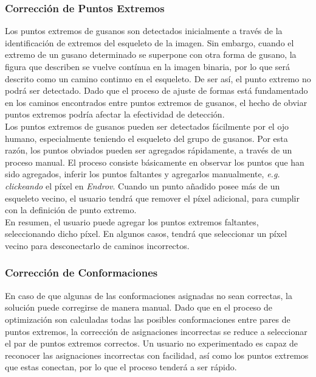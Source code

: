 \subsubsection{Correcci\'on de Puntos Extremos}
\label{sec:endpointop}

Los puntos extremos de gusanos son detectados inicialmente a trav\'es de la
identificaci\'on de extremos del esqueleto de la imagen. Sin embargo, cuando
el extremo de un gusano determinado se superpone con otra forma de gusano, la
figura que describen se vuelve cont\'inua en la imagen binaria, por lo que ser\'a
descrito como un camino continuo en el esqueleto. De ser as\'i, el punto 
extremo no podr\'a ser detectado. Dado que el proceso de ajuste de formas est\'a 
fundamentado en los caminos encontrados entre puntos extremos de gusanos, el hecho de obviar
puntos extremos podr\'ia afectar la efectividad de detecci\'on.\\

Los puntos extremos de gusanos pueden ser detectados f\'acilmente por el ojo humano, 
especialmente teniendo el esqueleto del grupo de gusanos. Por esta raz\'on, los puntos
obviados pueden ser agregados r\'apidamente, a trav\'es de un proceso manual. El proceso
consiste b\'asicamente en observar los puntos que han sido agregados, inferir los
puntos faltantes y agregarlos manualmente, \emph{e.g.} \emph{clickeando} el p\'ixel
en \emph{Endrov}. Cuando un punto a\~nadido posee m\'as de un esqueleto vecino, el
usuario tendr\'a que remover el p\'ixel adicional, para cumplir con la
definici\'on de punto extremo.\\

En resumen, el usuario puede agregar los puntos extremos faltantes, seleccionando
dicho p\'ixel. En algunos casos, tendr\'a que seleccionar un p\'ixel vecino para
desconectarlo de caminos incorrectos.

\subsubsection{Correcci\'on de Conformaciones}
\label{sec:matchfix}

En caso de que algunas de las conformaciones asignadas no sean correctas,
la soluci\'on puede corregirse de manera manual. Dado que en el proceso de
optimizaci\'on son calculadas todas las posibles conformaciones entre
pares de puntos extremos, la correcci\'on de asignaciones incorrectas
se reduce a seleccionar el par de puntos extremos correctos. 
Un usuario no experimentado es capaz de reconocer las asignaciones incorrectas
con facilidad, as\'i como los puntos extremos que estas conectan, por lo que
el proceso tender\'a a ser r\'apido.

